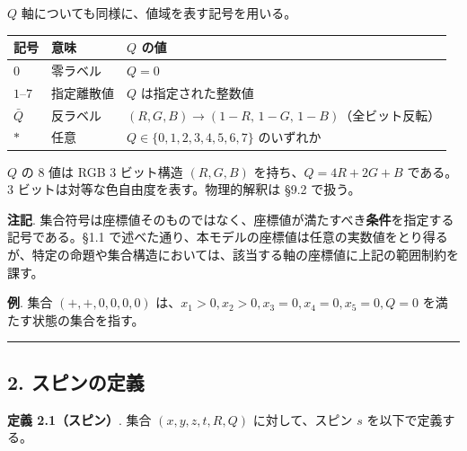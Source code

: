 \documentclass[
  a4paper,11pt]{ltjsarticle}
\newcounter{none}
\theoremstyle{definition}
\theoremstyle{remark}
\begin{document}
\(Q\) 軸についても同様に、値域を表す記号を用いる。

{\def\LTcaptype{none} %
\begin{longtable}[]{@{}
  >{\centering\arraybackslash}p{}
  >{\raggedright\arraybackslash}p{}
  >{\raggedright\arraybackslash}p{}@{}}
\toprule\noalign{}
\begin{minipage}[b]{\linewidth}\centering
記号
\end{minipage} & \begin{minipage}[b]{\linewidth}\raggedright
意味
\end{minipage} & \begin{minipage}[b]{\linewidth}\raggedright
\(Q\) の値
\end{minipage} \\
\midrule\noalign{}
\endhead
\bottomrule\noalign{}
\endlastfoot
\(0\) & 零ラベル & \(Q = 0\) \\
\(1\)--\(7\) & 指定離散値 & \(Q\) は指定された整数値 \\
\(\bar{Q}\) & 反ラベル &
\((R, G, B) \to (1{-}R,\, 1{-}G,\, 1{-}B)\)（全ビット反転） \\
\(*\) & 任意 & \(Q \in \{0, 1, 2, 3, 4, 5, 6, 7\}\) のいずれか \\
\end{longtable}
}

\(Q\) の 8 値は RGB 3 ビット構造 \((R, G, B)\)
を持ち、\(Q = 4R + 2G + B\) である。3
ビットは対等な色自由度を表す。物理的解釈は §9.2 で扱う。

\textbf{注記}.
集合符号は座標値そのものではなく、座標値が満たすべき\textbf{条件}を指定する記号である。§1.1
で述べた通り、本モデルの座標値は任意の実数値をとり得るが、特定の命題や集合構造においては、該当する軸の座標値に上記の範囲制約を課す。

\textbf{例}. 集合 \((+, +, 0, 0, 0, 0)\)
は、\(x_1 > 0, x_2 > 0, x_3 = 0, x_4 = 0, x_5 = 0, Q = 0\)
を満たす状態の集合を指す。

\begin{center}\rule{0.5\linewidth}{0.5pt}\end{center}

\subsection{2. スピンの定義}\label{ux30b9ux30d4ux30f3ux306eux5b9aux7fa9}

\textbf{定義 2.1（スピン）}. 集合 \((x, y, z, t, R, Q)\)
に対して、スピン \(s\) を以下で定義する。
\end{document}
